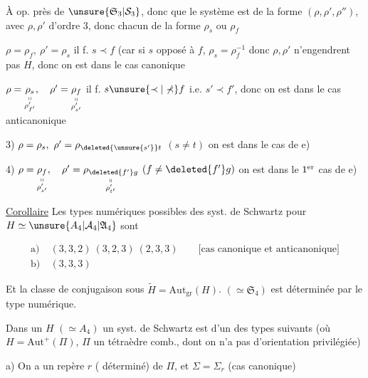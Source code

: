 
À  op. près de $\unsure{\mathfrak S_3|\mathcal S_3}$,  donc que le système est de la forme $(\rho,\rho',\rho'')$, avec $\rho,\rho'$ d'ordre $3$, donc chacun de la forme $\rho_s$ ou $\rho_f$

 $\rho=\rho_f,\ \rho'=\rho_s$ il f. $s\prec f$ (car si $s$ opposé à $f$, $\rho_s=\rho_f^{-1}$ donc $\rho,\rho'$ n'engendrent pas $H$, donc on est dans le cas canonique


 $\rho=\underset{\substack{\shortparallel\\\rho'_{f'}}}{\rho_s},\quad\rho'=\underset{\substack{\shortparallel\\\rho'_{s'}}}{\rho_f}$ il f. $s\unsure{\prec|\nprec} f$ i.e. $s'\prec f'$, donc on est dans le cas anticanonique


3) $\rho=\rho_s,\ \rho'=\rho_{\deleted{\unsure{s'}}t}$  $(s\ne t)$ on est dans le  cas de e)


4) $\rho=\underset{\substack{\shortparallel\\\rho'_{s'}}}{\rho_f},\quad\rho'=\underset{\substack{\shortparallel\\\rho'_{t'}}}{\rho_{\deleted{f'}g}}$  $(f\ne\deleted{f'}g)$ on est dans le $1\textsuperscript{er}$ cas de e)


\uline{Corollaire} Les types numériques possibles des syst. de Schwartz pour $H\simeq\unsure{A_4|\mathcal A_4|\mathfrak A_4}$ sont

\[
\begin{aligned}
\text{a)}\ &(3,3,2)\ (3,2,3)\ (2,3,3)\qquad\text{[cas canonique et anticanonique]}\\
\text{b)}\ &(3,3,3)
\end{aligned}
\]

Et la classe de conjugaison sous $\widetilde H=\mathrm{Aut}_{\mathrm{gr}}(H)$. $(\simeq\mathfrak S_4)$ est déterminée par le type numérique.

Dans un $H$ $(\simeq A_4)$ un syst. de Schwartz est d'un des types suivants (où $H=\mathrm{Aut}^{+}(\Pi)$, $\Pi$ un tétraèdre comb., dont on n'a pas d'orientation privilégiée)


a) On a un repère $r$ ( déterminé) de $\Pi$, et $\Sigma=\Sigma_r$ (cas canonique)



